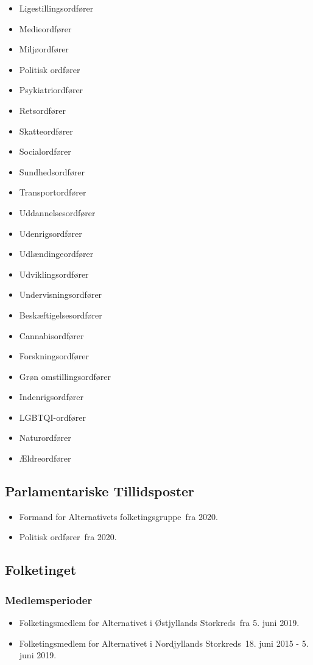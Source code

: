 \documentclass[11pt, a4paper]{awesome-cv}
\begin{document}
\begin{cvletter}
\begin{itemize}
\item Ligestillingsordfører
\item Medieordfører
\item Miljøordfører
\item Politisk ordfører
\item Psykiatriordfører
\item Retsordfører
\item Skatteordfører
\item Socialordfører
\item Sundhedsordfører
\item Transportordfører
\item Uddannelsesordfører
\item Udenrigsordfører
\item Udlændingeordfører
\item Udviklingsordfører
\item Undervisningsordfører
\item Beskæftigelsesordfører
\item Cannabisordfører
\item Forskningsordfører
\item Grøn omstillingsordfører
\item Indenrigsordfører
\item LGBTQI-ordfører
\item Naturordfører
\item Ældreordfører
\end{itemize}
\subsection*{Parlamentariske Tillidsposter}
\begin{itemize}
\item Formand for Alternativets folketingsgruppe fra 2020.
\item Politisk ordfører fra 2020.
\end{itemize}
\subsection*{Folketinget}
\subsubsection*{Medlemsperioder}
\begin{itemize}
\item Folketingsmedlem for Alternativet i Østjyllands Storkreds fra 5. juni 2019.
\item Folketingsmedlem for Alternativet i Nordjyllands Storkreds 18. juni 2015 - 5. juni 2019.
\end{itemize}

\end{cvletter}
\end{document}

